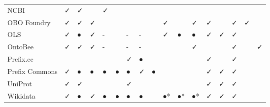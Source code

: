\begin{table}
\begin{tabular}{lllllllllllllllll}
           NCBI &              ✓ &        ✓ &       &          ✓ &            &          &                &               &         &         &         &                            &        &                 &          &        \\
    OBO Foundry &              ✓ &        ✓ &     ✓ &            &            &          &                &               &       ✓ &         &       ✓ &                          ✓ &        &               ✓ &        ✓ &        \\
            OLS &              ✓ &        ● &     ✓ &          - &            &        - &              - &               &       ✓ &       ● &       ● &                          ✓ &      ✓ &               ✓ &          &        \\
        OntoBee &              ✓ &        ✓ &     ✓ &          - &            &        - &              - &               &         &         &       ✓ &                            &        &               ✓ &          &      ✓ \\
      Prefix.cc &                &          &       &            &            &        ✓ &              ● &               &         &         &         &                          ✓ &        &               ✓ &          &        \\
 Prefix Commons &              ✓ &        ● &     ● &          ● &          ● &        ● &              ✓ &             ● &         &         &         &                          ✓ &      ✓ &               ✓ &          &        \\
        UniProt &              ✓ &        ✓ &       &            &            &        ✓ &                &               &         &         &         &                          ✓ &      ✓ &               ✓ &          &        \\
       Wikidata &              ✓ &        ● &     ✓ &          ● &          ● &        ● &              ● &               &      ●* &      ●* &      ●* &                          ✓ &      ✓ &               ✓ &          &        \\
\bottomrule
\end{tabular}
\end{table}
